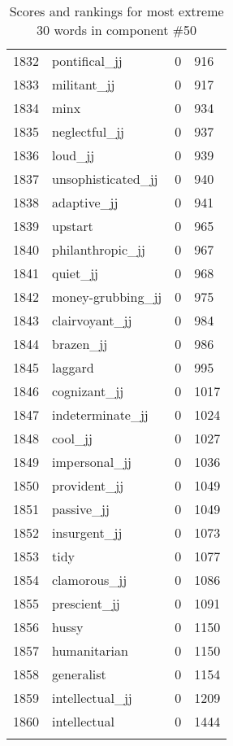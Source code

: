 \begin{longtable}[!htbp]{| rlr@{.}l |}
    1832 & pontifical\_jj & 0 & 916 \\
    1833 & militant\_jj & 0 & 917 \\
    1834 & minx & 0 & 934 \\
    1835 & neglectful\_jj & 0 & 937 \\
    1836 & loud\_jj & 0 & 939 \\
    1837 & unsophisticated\_jj & 0 & 940 \\
    1838 & adaptive\_jj & 0 & 941 \\
    1839 & upstart & 0 & 965 \\
    1840 & philanthropic\_jj & 0 & 967 \\
    1841 & quiet\_jj & 0 & 968 \\
    1842 & money-grubbing\_jj & 0 & 975 \\
    1843 & clairvoyant\_jj & 0 & 984 \\
    1844 & brazen\_jj & 0 & 986 \\
    1845 & laggard & 0 & 995 \\
    1846 & cognizant\_jj & 0 & 1017 \\
    1847 & indeterminate\_jj & 0 & 1024 \\
    1848 & cool\_jj & 0 & 1027 \\
    1849 & impersonal\_jj & 0 & 1036 \\
    1850 & provident\_jj & 0 & 1049 \\
    1851 & passive\_jj & 0 & 1049 \\
    1852 & insurgent\_jj & 0 & 1073 \\
    1853 & tidy & 0 & 1077 \\
    1854 & clamorous\_jj & 0 & 1086 \\
    1855 & prescient\_jj & 0 & 1091 \\
    1856 & hussy & 0 & 1150 \\
    1857 & humanitarian & 0 & 1150 \\
    1858 & generalist & 0 & 1154 \\
    1859 & intellectual\_jj & 0 & 1209 \\
    1860 & intellectual & 0 & 1444 \\
    \hline
    \caption{Scores and rankings for most extreme 30 words in component \#50} \\
\end{longtable}
